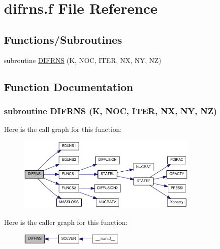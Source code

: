 \hypertarget{difrns_8f}{
\section{difrns.f File Reference}
\label{difrns_8f}
}
\subsection*{Functions/Subroutines}
\begin{DoxyCompactItemize}
\item 
subroutine \hyperlink{difrns_8f_a8d0ce59a93ccaceca1de81643d6c2579}{DIFRNS} (K, NOC, ITER, NX, NY, NZ)
\end{DoxyCompactItemize}


\subsection{Function Documentation}
\hypertarget{difrns_8f_a8d0ce59a93ccaceca1de81643d6c2579}{
\subsubsection[{DIFRNS}]{\setlength{\rightskip}{0pt plus 5cm}subroutine DIFRNS (K, \/  NOC, \/  ITER, \/  NX, \/  NY, \/  NZ)}}
\label{difrns_8f_a8d0ce59a93ccaceca1de81643d6c2579}


Here is the call graph for this function:\nopagebreak
\begin{figure}[H]
\begin{center}
\leavevmode
\includegraphics[width=251pt]{difrns_8f_a8d0ce59a93ccaceca1de81643d6c2579_cgraph}
\end{center}
\end{figure}


Here is the caller graph for this function:\nopagebreak
\begin{figure}[H]
\begin{center}
\leavevmode
\includegraphics[width=146pt]{difrns_8f_a8d0ce59a93ccaceca1de81643d6c2579_icgraph}
\end{center}
\end{figure}
